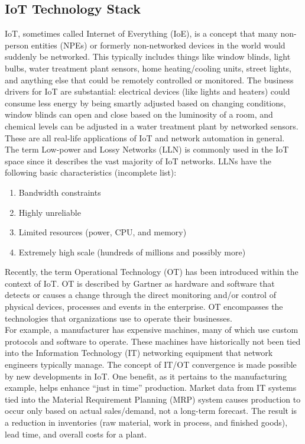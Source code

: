 \subsection{IoT Technology Stack}
IoT, sometimes called Internet of Everything (IoE), is a concept that many
non-person entities (NPEs) or formerly non-networked devices in the world
would suddenly be networked. This typically includes things like window
blinds, light bulbs, water treatment plant sensors, home heating/cooling
units, street lights, and anything else that could be remotely controlled or
monitored. The business drivers for IoT are substantial: electrical devices
(like lights and heaters) could consume less energy by being smartly adjusted
based on changing conditions, window blinds can open and close based on the
luminosity of a room, and chemical levels can be adjusted in a water treatment
plant by networked sensors. These are all real-life applications of IoT and
network automation in general. \\

The term Low-power and Lossy Networks (LLN) is commonly used in the IoT space
since it describes the vast majority of IoT networks. LLNs have the following
basic characteristics (incomplete list):

\begin{enumerate}
  \item	Bandwidth constraints
  \item	Highly unreliable
  \item	Limited resources (power, CPU, and memory)
  \item	Extremely high scale (hundreds of millions and possibly more)
\end{enumerate}

Recently, the term Operational Technology (OT) has been introduced within the
context of IoT. OT is described by Gartner as hardware and software that
detects or causes a change through the direct monitoring and/or control of
physical devices, processes and events in the enterprise. OT encompasses the
technologies that organizations use to operate their businesses. \\

For example, a manufacturer has expensive machines, many of which use custom
protocols and software to operate. These machines have historically not been
tied into the Information Technology (IT) networking equipment that network
engineers typically manage. The concept of IT/OT convergence is made possible
by new developments in IoT. One benefit, as it pertains to the manufacturing
example, helps enhance ``just in time'' production. Market data from IT
systems tied into the Material Requirement Planning (MRP) system causes
production to occur only based on actual sales/demand, not a long-term
forecast. The result is a reduction in inventories (raw material, work in
process, and finished goods), lead time, and overall costs for a plant.

